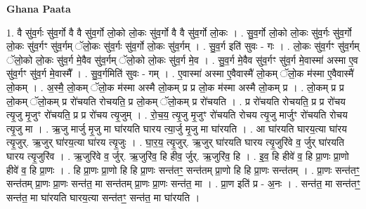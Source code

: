 \documentclass[17pt]{extarticle}
\begin{document}
\textbf{Ghana Paata } \newline

1. वै सु॑व॒र्गः सु॑व॒र्गो वै वै सु॑व॒र्गो लो॒को लो॒कः सु॑व॒र्गो वै वै सु॑व॒र्गो लो॒कः । . सु॒व॒र्गो लो॒को लो॒कः सु॑व॒र्गः सु॑व॒र्गो लो॒कः सु॑व॒र्गꣳ सु॑व॒र्गम् ॅलो॒कः सु॑व॒र्गः सु॑व॒र्गो लो॒कः सु॑व॒र्गम् । . सु॒व॒र्ग इति॑ सुवः - गः । . लो॒कः सु॑व॒र्गꣳ सु॑व॒र्गम् ॅलो॒को लो॒कः सु॑व॒र्ग मे॒वैव सु॑व॒र्गम् ॅलो॒को लो॒कः सु॑व॒र्ग मे॒व । . सु॒व॒र्ग मे॒वैव सु॑व॒र्गꣳ सु॑व॒र्ग मे॒वास्मा॑ अस्मा ए॒व सु॑व॒र्गꣳ सु॑व॒र्ग मे॒वास्मै᳚ । . सु॒व॒र्गमिति॑ सुवः - गम् । . ए॒वास्मा॑ अस्मा ए॒वैवास्मै॑ लो॒कम् ॅलो॒क म॑स्मा ए॒वैवास्मै॑ लो॒कम् । . अ॒स्मै॒ लो॒कम् ॅलो॒क म॑स्मा अस्मै लो॒कम् प्र प्र लो॒क म॑स्मा अस्मै लो॒कम् प्र । . लो॒कम् प्र प्र लो॒कम् ॅलो॒कम् प्र रो॑चयति रोचयति॒ प्र लो॒कम् ॅलो॒कम् प्र रो॑चयति । . प्र रो॑चयति रोचयति॒ प्र प्र रो॑चय त्यृ॒जु मृ॒जुꣳ रो॑चयति॒ प्र प्र रो॑चय त्यृ॒जुम् । . रो॒च॒य॒ त्यृ॒जु मृ॒जुꣳ रो॑चयति रोचय त्यृ॒जु मार्जुꣳ रो॑चयति रोचय त्यृ॒जु मा । . ऋ॒जु मार्जु मृ॒जु मा घा॑रयति घारय त्या॒र्जु मृ॒जु मा घा॑रयति । . आ घा॑रयति घारय॒त्या घा॑रय त्यृ॒जुर्. ऋ॒जुर् घा॑रय॒त्या घा॑रय त्यृ॒जुः । . घा॒र॒य॒ त्यृ॒जुर्. ऋ॒जुर् घा॑रयति घारय त्यृ॒जुरि॑वे व॒ र्जुर् घा॑रयति घारय त्यृ॒जुरि॑व । . ऋ॒जुरि॑वे व॒ र्जुर्. ऋ॒जुरि॑व॒ हि हीव॒ र्जुर्. ऋ॒जुरि॑व॒ हि । . इ॒व॒ हि हीवे॑ व॒ हि प्रा॒णः प्रा॒णो हीवे॑ व॒ हि प्रा॒णः । . हि प्रा॒णः प्रा॒णो हि हि प्रा॒णः सन्त॑तꣳ॒॒ सन्त॑तम् प्रा॒णो हि हि प्रा॒णः सन्त॑तम् । . प्रा॒णः सन्त॑तꣳ॒॒ सन्त॑तम् प्रा॒णः प्रा॒णः सन्त॑त॒ मा सन्त॑तम् प्रा॒णः प्रा॒णः सन्त॑त॒ मा । . प्रा॒ण इति॑ प्र - अ॒नः । . सन्त॑त॒ मा सन्त॑तꣳ॒॒ सन्त॑त॒ मा घा॑रयति घारय॒त्या सन्त॑तꣳ॒॒ सन्त॑त॒ मा घा॑रयति । \newline
\end{document}
